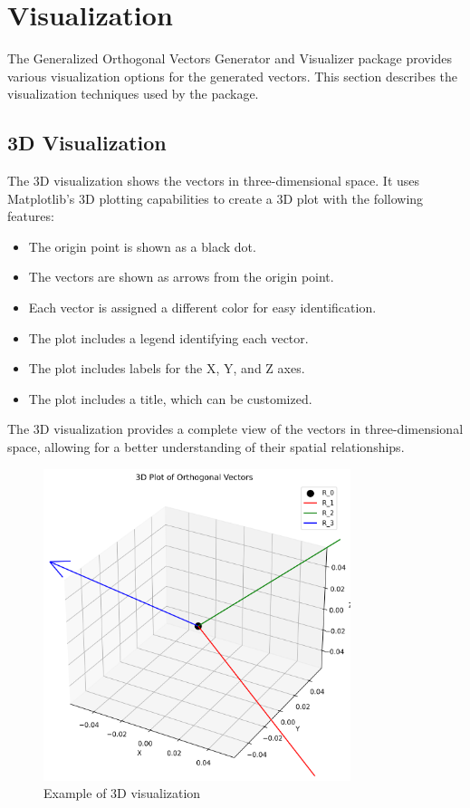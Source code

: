 \section{Visualization}

The Generalized Orthogonal Vectors Generator and Visualizer package provides various visualization options for the generated vectors. This section describes the visualization techniques used by the package.

\subsection{3D Visualization}

The 3D visualization shows the vectors in three-dimensional space. It uses Matplotlib's 3D plotting capabilities to create a 3D plot with the following features:

\begin{itemize}
    \item The origin point is shown as a black dot.
    \item The vectors are shown as arrows from the origin point.
    \item Each vector is assigned a different color for easy identification.
    \item The plot includes a legend identifying each vector.
    \item The plot includes labels for the X, Y, and Z axes.
    \item The plot includes a title, which can be customized.
\end{itemize}

The 3D visualization provides a complete view of the vectors in three-dimensional space, allowing for a better understanding of their spatial relationships.

\begin{figure}[H]
    \centering
    \includegraphics[width=0.8\textwidth]{figures/3d_plot.png}
    \caption{Example of 3D visualization}
    \label{fig:vis_3d_plot}
\end{figure}


